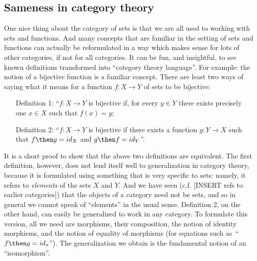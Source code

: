 
\subsection{Sameness in category theory}

One nice thing about the category of sets is that we are all used to working with sets and functions. And many concepts that are familiar in the setting of sets and functions can actually be reformulated in a way which makes sense for lots of other categories, if not for all categories. It can be fun, and insightful, to see known definitions transformed into ``category theory language''. For example: the notion of a bijective function is a familiar concept. There are least two ways of saying what it means for a function $f : X \to Y$ of sets to be bijective:
\begin{itemize}
\item[Definition 1:] ``$f\colon X \to Y$ is bijective if, for every $y \in Y$ there exists precisely one $x \in X$ such that $f(x) = y$;
\item[Definition 2:] ``$f: X \to Y$ is bijective if there exists a function $g\colon Y \rightarrow X$ such that $f \then g = id_X$ and $g \then f = id_Y$''. 
\end{itemize}

It is a short proof to show that the above two definitions are equivalent. The first definition, however, does not lend itself well to generalization in category theory, because it is formulated using something that is very specific to sets: namely, it refers to \emph{elements} of the sets $X$ and $Y$. And we have seen (c.f. [INSERT refs to earlier categories]) that the objects of a category need not be sets, and so in general we cannot speak of ``elements'' in the usual sense. Definition 2, on the other hand, can easily be generalized to work in any category. To formulate this version, all we need are morphisms, their composition, the notion of identity morphisms, and the notion of equality of morphisms (for equations such as~``$f \then g = id_x$''). The generalization we obtain is the fundamental notion of an ``isomorphism''.


